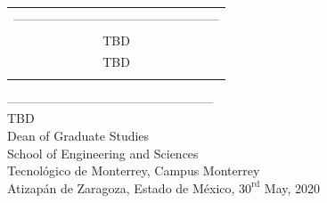 \documentclass[11pt, a4paper, oneside]{Thesis} %
\begin{document}
\begin{center}
\begin{table}[hbtp]
\begin{flushright}
\begin{tabular}{c}
                {--------------------------------------------------} \\
                TBD                                                  \\
                TBD                                                  \\
                \vspace*{.6 cm}                                      \\
            \end{tabular}
        \end{flushright}
    \end{table}
    {--------------------------------------------------} \\
    TBD\\
    Dean of Graduate Studies\\
    School of Engineering and Sciences\\
    Tecnológico de Monterrey, Campus Monterrey\vspace*{.4 cm}\\
    {\large Atizapán de Zaragoza, Estado de México, $30^\text{rd}$ May, 2020}
\end{center}
\clearpage
\end{document}

